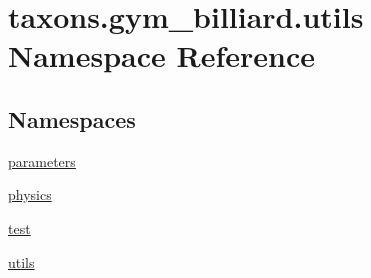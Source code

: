 \hypertarget{namespacetaxons_1_1gym__billiard_1_1utils}{}\section{taxons.\+gym\+\_\+billiard.\+utils Namespace Reference}
\label{namespacetaxons_1_1gym__billiard_1_1utils}
\subsection*{Namespaces}
\begin{DoxyCompactItemize}
\item 
 \hyperlink{namespacetaxons_1_1gym__billiard_1_1utils_1_1parameters}{parameters}
\item 
 \hyperlink{namespacetaxons_1_1gym__billiard_1_1utils_1_1physics}{physics}
\item 
 \hyperlink{namespacetaxons_1_1gym__billiard_1_1utils_1_1test}{test}
\item 
 \hyperlink{namespacetaxons_1_1gym__billiard_1_1utils_1_1utils}{utils}
\end{DoxyCompactItemize}
